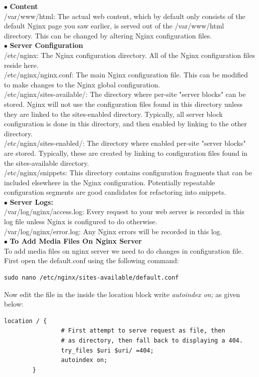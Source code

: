 \documentclass[journal,12pt,onecolumn]{IEEEtran}
\begin{document}
\begin{flushleft}
\begin{enumerate}
$\bullet$ \textbf{Content}\\
\textsf{/var/www/html:} The actual web content, which by default only consists of the default Nginx page you saw earlier, is served out of the /var/www/html directory. This can be changed by altering Nginx configuration files.\\
\bigskip
$\bullet$ \textbf{Server Configuration}\\
\medskip
\textsf{/etc/nginx:} The Nginx configuration directory. All of the Nginx configuration files reside here.\\
\medskip
\textsf{/etc/nginx/nginx.conf:} The main Nginx configuration file. This can be modified to make changes to the Nginx global configuration.\\
\medskip
\textsf{/etc/nginx/sites-available/:} The directory where per-site "server blocks" can be stored. Nginx will not use the configuration files found in this directory unless they are linked to the sites-enabled directory. Typically, all server block configuration is done in this directory, and then enabled by linking to the other directory.\\
\medskip
\textsf{/etc/nginx/sites-enabled/:} The directory where enabled per-site "server blocks" are stored. Typically, these are created by linking to configuration files found in the sites-available directory.\\
\medskip
\textsf{/etc/nginx/snippets:} This directory contains configuration fragments that can be included elsewhere in the Nginx configuration. Potentially repeatable configuration segments are good candidates for refactoring into snippets.\\
\bigskip
$\bullet$ \textbf{Server Logs:} \\
\medskip
\textsf{/var/log/nginx/access.log:}  Every request to your web server is recorded in this log file unless Nginx is configured to do otherwise.\\
\medskip
\textsf{/var/log/nginx/error.log:}  Any Nginx errors will be recorded in this log.\\
\medskip
$\bullet$ \textbf{To Add Media Files On Nginx Server} \\
To add media files on nginx server we need to do changes in configuration file. First open the default.conf using the following command:
\medskip
\begin{lstlisting}[frame=single,linewidth=15cm,breaklines=true]
sudo nano /etc/nginx/sites-available/default.conf
\end{lstlisting}
\bigskip
Now edit the file in the inside the location block write \textit{autoindex on;} as given below:
\medskip
\begin{lstlisting}[frame=single,linewidth=15cm,breaklines=true]
 location / {
                # First attempt to serve request as file, then
                # as directory, then fall back to displaying a 404.
                try_files $uri $uri/ =404;
                autoindex on;
        }


\end{lstlisting}
\end{enumerate}
\end{flushleft}
\end{document}
